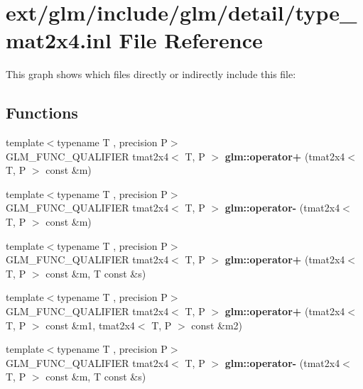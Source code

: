 \hypertarget{type__mat2x4_8inl}{\section{ext/glm/include/glm/detail/type\-\_\-mat2x4.inl File Reference}
\label{type__mat2x4_8inl}
}
This graph shows which files directly or indirectly include this file\-:
\subsection*{Functions}
\begin{DoxyCompactItemize}
\item 
\hypertarget{namespaceglm_a9ebbe55e926abef0e40cffbf794f64bc}{{\footnotesize template$<$typename T , precision P$>$ }\\G\-L\-M\-\_\-\-F\-U\-N\-C\-\_\-\-Q\-U\-A\-L\-I\-F\-I\-E\-R tmat2x4$<$ T, P $>$ {\bfseries glm\-::operator+} (tmat2x4$<$ T, P $>$ const \&m)}\label{namespaceglm_a9ebbe55e926abef0e40cffbf794f64bc}

\item 
\hypertarget{namespaceglm_a213179e047320d6b697ff765b358471d}{{\footnotesize template$<$typename T , precision P$>$ }\\G\-L\-M\-\_\-\-F\-U\-N\-C\-\_\-\-Q\-U\-A\-L\-I\-F\-I\-E\-R tmat2x4$<$ T, P $>$ {\bfseries glm\-::operator-\/} (tmat2x4$<$ T, P $>$ const \&m)}\label{namespaceglm_a213179e047320d6b697ff765b358471d}

\item 
\hypertarget{namespaceglm_aecf1d857d72523972e8385ebf10ad896}{{\footnotesize template$<$typename T , precision P$>$ }\\G\-L\-M\-\_\-\-F\-U\-N\-C\-\_\-\-Q\-U\-A\-L\-I\-F\-I\-E\-R tmat2x4$<$ T, P $>$ {\bfseries glm\-::operator+} (tmat2x4$<$ T, P $>$ const \&m, T const \&s)}\label{namespaceglm_aecf1d857d72523972e8385ebf10ad896}

\item 
\hypertarget{namespaceglm_ad38e1685b1567e6b9085d474b7331b92}{{\footnotesize template$<$typename T , precision P$>$ }\\G\-L\-M\-\_\-\-F\-U\-N\-C\-\_\-\-Q\-U\-A\-L\-I\-F\-I\-E\-R tmat2x4$<$ T, P $>$ {\bfseries glm\-::operator+} (tmat2x4$<$ T, P $>$ const \&m1, tmat2x4$<$ T, P $>$ const \&m2)}\label{namespaceglm_ad38e1685b1567e6b9085d474b7331b92}

\item 
\hypertarget{namespaceglm_afd47ae08641e9193948066f714596f2c}{{\footnotesize template$<$typename T , precision P$>$ }\\G\-L\-M\-\_\-\-F\-U\-N\-C\-\_\-\-Q\-U\-A\-L\-I\-F\-I\-E\-R tmat2x4$<$ T, P $>$ {\bfseries glm\-::operator-\/} (tmat2x4$<$ T, P $>$ const \&m, T const \&s)}\label{namespaceglm_afd47ae08641e9193948066f714596f2c}


\end{DoxyCompactItemize}
